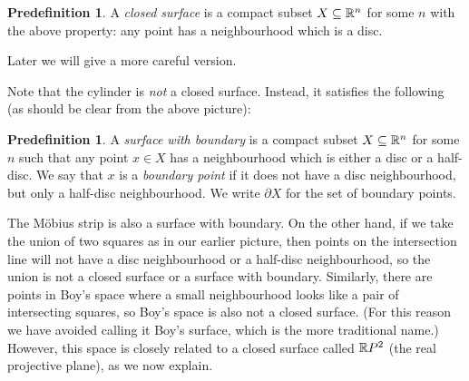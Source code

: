 \documentclass[reqno]{amsart}
\theoremstyle{definition}
\newtheorem{predefinition}[theorem]{Predefinition}
\begin{document}
\begin{predefinition}
 A \emph{closed surface} is a compact subset $X\subseteq\mathbb{R}^n$ for some $n$
 with the above property: any point has a neighbourhood which is a
 disc. 
\end{predefinition}

Later we will give a more careful version.

Note that the cylinder is \emph{not} a closed surface.  Instead, it
satisfies the following (as should be clear from the above picture):

\begin{predefinition}
 A \emph{surface with boundary} is a compact subset $X\subseteq\mathbb{R}^n$ for
 some $n$ such that any point $x\in X$ has a neighbourhood which is
 either a disc or a half-disc.  We say that $x$ is a \emph{boundary
  point} if it does not have a disc neighbourhood, but only a
 half-disc neighbourhood.  We write $\partial X$ for the set of
 boundary points.  
\end{predefinition}

The M\"obius strip is also a surface with boundary.  On the other
hand, if we take the union of two squares as in our earlier picture,
then points on the intersection line will not have a disc
neighbourhood or a half-disc neighbourhood, so the union is not a
closed surface or a surface with boundary.  Similarly, there are
points in Boy's space where a small neighbourhood looks like a pair of
intersecting squares, so Boy's space is also not a closed surface.
(For this reason we have avoided calling it Boy's surface, which is
the more traditional name.)  However, this space is closely related to
a closed surface called $\mathbb{R} P^2$ (the real projective plane), as we
now explain. 
\end{document}
